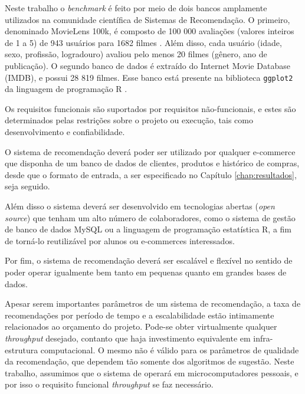 Neste trabalho o \textit{benchmark} é feito por meio de dois bancos amplamente utilizados na comunidade científica de Sistemas de Recomendação. O primeiro, denominado MovieLens 100k, é composto de 100 000 avaliações (valores inteiros de 1 a 5) de 943 usuários para 1682 filmes \cite{movielensdataset}. Além disso, cada usuário (idade, sexo, profissão, logradouro) avaliou pelo menos 20 filmes (gênero, ano de publicação). O segundo banco de dados é extraído do Internet Movie Database (IMDB), e possui 28 819 filmes. Esse banco está presente na biblioteca \texttt{ggplot2} da linguagem de programação R \cite{moviesggplot2dataset}.  

Os requisitos funcionais são suportados por requisitos não-funcionais, e estes são determinados pelas restrições sobre o projeto ou execução, tais como desenvolvimento e confiabilidade.

O sistema de recomendação deverá poder ser utilizado por qualquer e-commerce que disponha de um banco de dados de clientes, produtos e histórico de compras, desde que o formato de entrada, a ser especificado no Capítulo \ref{chap:resultados}, seja seguido.

Além disso o sistema deverá ser desenvolvido em tecnologias abertas (\textit{open source}) que tenham um alto número de colaboradores, como o sistema de gestão de banco de dados MySQL ou a linguagem de programação estatística R, a fim de torná-lo reutilizável por alunos ou e-commerces interessados.

Por fim, o sistema de recomendação deverá ser escalável e flexível no sentido de poder operar igualmente bem tanto em pequenas quanto em grandes bases de dados.

Apesar serem importantes parâmetros de um sistema de recomendação, a taxa de recomendações por período de tempo e a escalabilidade estão intimamente relacionados ao orçamento do projeto. Pode-se obter virtualmente qualquer \textit{throughput} desejado, contanto que haja investimento equivalente em infra-estrutura computacional. O mesmo não é válido para os parâmetros de qualidade da recomendação, que dependem tão somente dos algoritmos de sugestão. Neste trabalho, assumimos que o sistema de operará em microcomputadores pessoais, e por isso o requisito funcional \textit{throughput} se faz necessário.